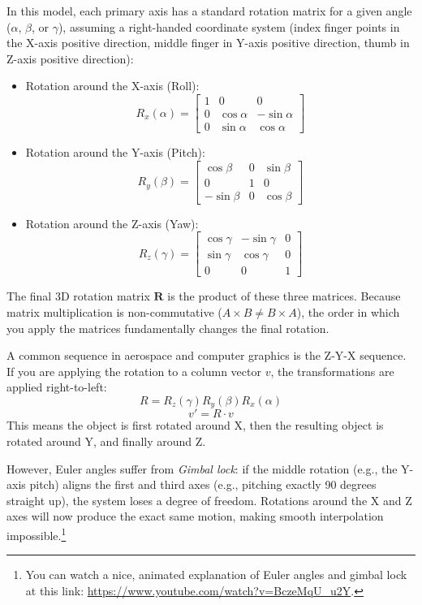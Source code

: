 In this model, each primary axis has a standard rotation matrix for a given angle ($\alpha$, $\beta$, or $\gamma$), assuming a right-handed coordinate system (index finger points in the X-axis positive direction, middle finger in Y-axis positive direction, thumb in Z-axis positive direction):
\begin{itemize}
\item Rotation around the X-axis (Roll):
    $$R_x(\alpha) = \begin{bmatrix} 1 & 0 & 0 \\ 0 & \cos\alpha & -\sin\alpha \\ 0 & \sin\alpha & \cos\alpha \end{bmatrix}$$

\item Rotation around the Y-axis (Pitch):
    $$R_y(\beta) = \begin{bmatrix} \cos\beta & 0 & \sin\beta \\ 0 & 1 & 0 \\ -\sin\beta & 0 & \cos\beta \end{bmatrix}$$

\item Rotation around the Z-axis (Yaw):
    $$R_z(\gamma) = \begin{bmatrix} \cos\gamma & -\sin\gamma & 0 \\ \sin\gamma & \cos\gamma & 0 \\ 0 & 0 & 1 \end{bmatrix}$$
\end{itemize}

The final 3D rotation matrix $\mathbf{R}$ is the product of these three matrices. Because matrix multiplication is non-commutative ($A \times B \neq B \times A$), the order in which you apply the matrices fundamentally changes the final rotation.

A common sequence in aerospace and computer graphics is the Z-Y-X sequence.
If you are applying the rotation to a column vector $v$, the transformations are applied right-to-left:
$$R = R_z(\gamma) R_y(\beta) R_x(\alpha)$$
$$v' = R \cdot v$$
This means the object is first rotated around X, then the resulting object is rotated around Y, and finally around Z.

However, Euler angles suffer from \emph{Gimbal lock}: if the middle rotation (e.g., the Y-axis pitch) aligns the first and third axes (e.g., pitching exactly 90 degrees straight up), the system loses a degree of freedom.
Rotations around the X and Z axes will now produce the exact same motion, making smooth interpolation impossible.\footnote{You can watch a nice, animated explanation of Euler angles and gimbal lock at this link: \url{https://www.youtube.com/watch?v=BczeMqU_u2Y}.}

